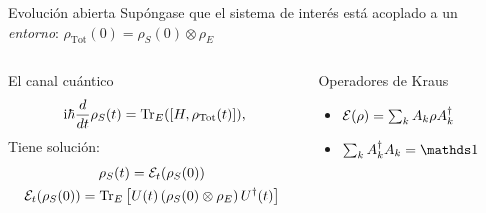 \begin{frame}{Evolución abierta}
    Supóngase que el sistema de interés está acoplado a un \textit{entorno}: $\rho_{\text{Tot}}(0)=\rho_{S}(0)\otimes\rho_{E}$
    \begin{columns}
        \begin{column}{0.5\textwidth}
            \begin{block}{El canal cuántico}
            \begin{align}
                \rmi\hbar\frac{d}{d t} \rho_{S}(t)=\Tr_{E}([H,\rho_{\text{Tot}}(t)])\rlap{,}\nonumber
            \end{align}\pause
            Tiene solución:
            \begin{equation}
                \begin{gathered}
                \rho_{S}(t)=\mathcal{E}_{t}(\rho_{S}(0))\\
                \mathcal{E}_{t}(\rho_{S}(0))=\Tr_{E}\qty[U(t)\left(\rho_{S}(0)\otimes\rho_{E}\right)U^{\dag}(t)]
            \end{gathered}\nonumber
            \end{equation}
            \end{block}
        \end{column}
        \pause
        \begin{column}{0.5\textwidth}
            \begin{block}{Operadores de Kraus}
            \begin{itemize}
                \item $\mathcal{E}(\rho)=\sum_{k}A_{k}\rho A^{\dagger}_{k}$
                \item $\sum_{k}A_{k}^{\dagger}A_{k}=\Id$
            \end{itemize}
        \end{block}
        \end{column}
    \end{columns}
\end{frame}



